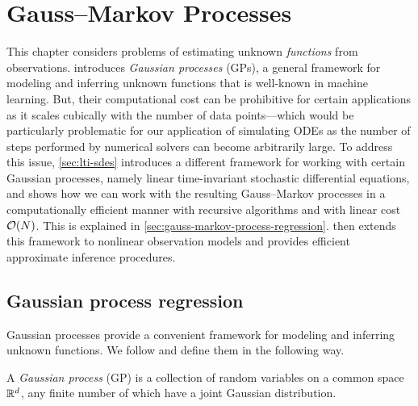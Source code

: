 \documentclass{mimosis}
\begin{document}
\chapter{Gauss--Markov Processes}
\label{sec:org462d373}
\label{sec:gauss-markov-processes}

This chapter considers problems of estimating unknown \emph{functions} from observations.
 introduces
\emph{Gaussian processes} (GPs), a general framework for modeling and inferring unknown functions that is well-known in machine learning.
But, their computational cost can be prohibitive for certain applications as it scales cubically with the number of data points---which would be particularly problematic for our application of simulating ODEs as the number of steps performed by numerical solvers can become arbitrarily large.
To address this issue,
\cref{sec:lti-sdes} introduces a different framework for working with certain Gaussian processes,
namely linear time-invariant stochastic differential equations,
and shows how we can work with the resulting Gauss--Markov processes in a computationally efficient manner with recursive algorithms and with linear cost \(\order{N}\).
This is explained in \cref{sec:gauss-markov-process-regression}.
 then extends this framework to nonlinear observation models and provides efficient approximate inference procedures.
\section{Gaussian process regression}
\label{sec:org0bffd9b}
\label{sec:gps}
\label{sec:gp-regression}

Gaussian processes provide a convenient framework for modeling and inferring unknown functions.
We follow
\textcite[Definition 2.1]{rasmussen2005gpml}
and define them in the following way.

\begin{definition}
A \emph{Gaussian process} (GP) is a collection of random variables on a common space \(\mathbb{R}^d\), any finite number of which have a joint Gaussian distribution.
\end{definition}
\end{document}
